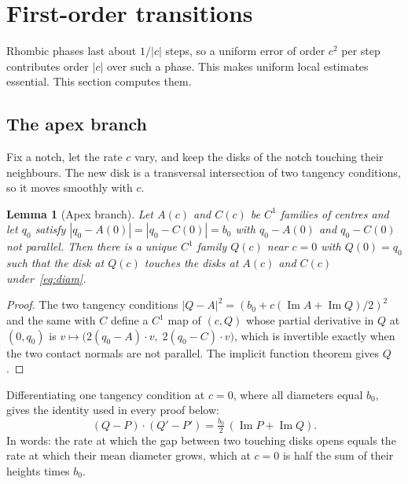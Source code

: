 \documentclass[11pt]{amsart}
\newtheorem{lemma}{Lemma}[section]
\theoremstyle{definition}
\DeclareMathOperator{\Imag}{Im}
\begin{document}
\section{First-order transitions}\label{sec:first}

Rhombic phases last about $1/|c|$ steps, so a uniform error of order $c^2$ per step contributes order $|c|$ over such a phase.
This makes uniform local estimates essential. This section computes them.

\subsection{The apex branch} Fix a notch, let the rate $c$ vary, and keep the disks of the notch
touching their neighbours. The new disk is a transversal intersection of two tangency conditions, so
it moves smoothly with $c$.

\begin{lemma}[Apex branch]\label{lem:apex}
Let $A(c)$ and $C(c)$ be $C^1$ families of centres and let $q_0$ satisfy $|q_0-A(0)|=|q_0-C(0)|=b_0$
with $q_0-A(0)$ and $q_0-C(0)$ not parallel. Then there is a unique $C^1$ family $Q(c)$ near $c=0$ with
$Q(0)=q_0$ such that the disk at $Q(c)$ touches the disks at $A(c)$ and $C(c)$ under~\eqref{eq:diam}.
\end{lemma}

\begin{proof}
The two tangency conditions $|Q-A|^2=(b_0+c(\Imag A+\Imag Q)/2)^2$ and the same with $C$ define a $C^1$
map of $(c,Q)$ whose partial derivative in $Q$ at $(0,q_0)$ is
$v\mapsto\bigl(2(q_0-A)\cdot v,\;2(q_0-C)\cdot v\bigr)$, which is invertible exactly when the two
contact normals are not parallel. The implicit function theorem gives $Q$.
\end{proof}

Differentiating one tangency condition at $c=0$, where all diameters equal $b_0$, gives the identity
used in every proof below:
\begin{equation}\label{eq:tangency}
(Q-P)\cdot(Q'-P')=\tfrac{b_0}{2}\,(\Imag P+\Imag Q).
\end{equation}
In words: the rate at which the gap between two touching disks opens equals the rate at which their
mean diameter grows, which at $c=0$ is half the sum of their heights times $b_0$.
\end{document}
